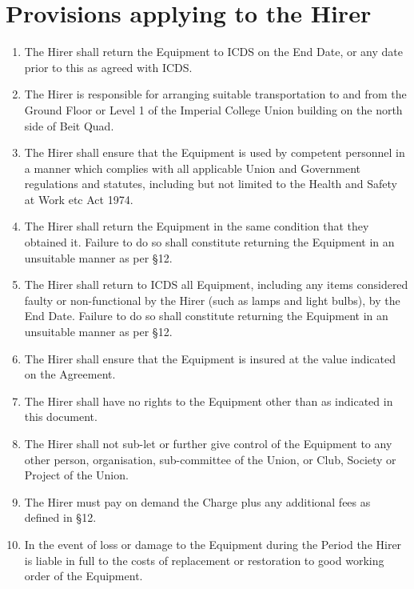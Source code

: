 \documentclass[a4paper]{tufte-handout}
\begin{document}
\section{Provisions applying to the Hirer}
\begin{enumerate}[resume]
    \item The Hirer shall return the Equipment to ICDS on the End Date, or any date prior to this as agreed with ICDS.
    \item The Hirer is responsible for arranging suitable transportation to and from the Ground Floor or Level 1 of the Imperial College Union building on the north side of Beit Quad.
    \item The Hirer shall ensure that the Equipment is used by competent personnel in a manner which complies with all applicable Union and Government regulations and statutes, including but not limited to the Health and Safety at Work etc Act 1974.
    \item The Hirer shall return the Equipment in the same condition that they obtained it. Failure to do so shall constitute returning the Equipment in an unsuitable manner as per \S12.
    \item The Hirer shall return to ICDS all Equipment, including any items considered faulty or non-functional by the Hirer (such as lamps and light bulbs), by the End Date. Failure to do so shall constitute returning the Equipment in an unsuitable manner as per \S12.
    \item The Hirer shall ensure that the Equipment is insured at the value indicated on the Agreement.
    \item The Hirer shall have no rights to the Equipment other than as indicated in this document.
    \item The Hirer shall not sub-let or further give control of the Equipment to any other person, organisation, sub-committee of the Union, or Club, Society or Project of the Union.
    \item The Hirer must pay on demand the Charge plus any additional fees as defined in \S12.
    \item In the event of loss or damage to the Equipment during the Period the Hirer is liable in full to the costs of replacement or restoration to good working order of the Equipment.
\end{enumerate}
\end{document}
